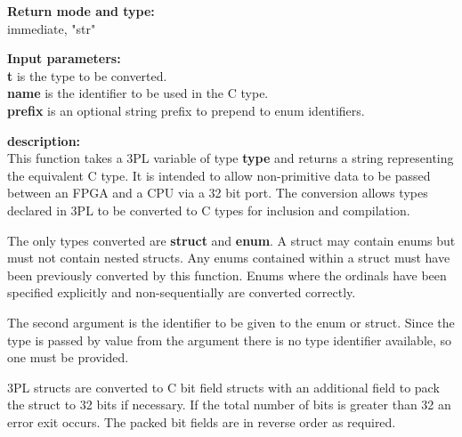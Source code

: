             {\bf Return mode and type:} \\
            immediate, "str"

            {\bf Input parameters:} \\            
            {\bf t} is the type to be converted. \\
            {\bf name} is the identifier to be used in the C type.\\
            {\bf prefix} is an optional string prefix to prepend to enum
            identifiers.

            {\bf description:} \\
            This function takes a 3PL variable of type {\bf type} and
            returns a string representing the equivalent C type. It is
            intended to allow non-primitive data to be passed between an FPGA and
            a CPU via a 32 bit port. The conversion allows types declared in 3PL
            to be converted to C types for inclusion and compilation.
            
            The only types converted are {\bf struct} and {\bf enum}. A struct may
            contain enums but must not contain nested structs. Any enums contained
            within a struct must have been previously converted by this function.
            Enums where the ordinals have been specified explicitly and
            non-sequentially are converted correctly.
            
            The second argument is the identifier to be given to the enum or
            struct. Since the type is passed by value from the argument there is
            no type identifier available, so one must be provided.
            
            3PL structs are converted to C bit field structs with an additional
            field to pack the struct to 32 bits if necessary. If the total
            number of bits is greater than 32 an error exit occurs. The packed
            bit fields are in reverse order as required.

